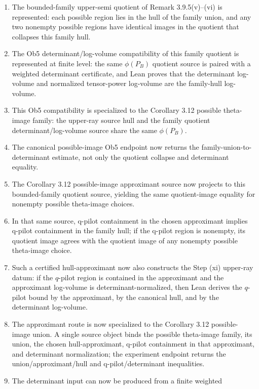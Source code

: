 \documentclass[11pt]{article}
\newcommand{\Lean}{Lean}
\theoremstyle{plain}
\theoremstyle{definition}
\theoremstyle{remark}
\begin{document}
\begin{enumerate}
  an approximant lies inside the canonical hull \(\phi(P)\), has log-volume
  between \(P\) and \(\phi(P)\), and is fixed by hull formation.
\item The bounded-family upper-semi quotient of Remark 3.9.5(v)--(vi) is
  represented: each possible region lies in the hull of the family union, and
  any two nonempty possible regions have identical images in the quotient that
  collapses this family hull.
\item The Ob5 determinant/log-volume compatibility of this family quotient is
  represented at finite level: the same \(\phi(P_B)\) quotient source is paired
  with a weighted determinant certificate, and \Lean{} proves that the
  determinant log-volume and normalized tensor-power log-volume are the
  family-hull log-volume.
\item This Ob5 compatibility is specialized to the Corollary 3.12 possible
  theta-image family: the upper-ray source hull and the family quotient
  determinant/log-volume source share the same \(\phi(P_B)\).
\item The canonical possible-image Ob5 endpoint now returns the
  family-union-to-determinant estimate, not only the quotient collapse and
  determinant equality.
\item The Corollary 3.12 possible-image approximant source now projects to
  this bounded-family quotient source, yielding the same quotient-image
  equality for nonempty possible theta-image choices.
\item In that same source, q-pilot containment in the chosen approximant
  implies q-pilot containment in the family hull; if the q-pilot region is
  nonempty, its quotient image agrees with the quotient image of any nonempty
  possible theta-image choice.
\item Such a certified hull-approximant now also constructs the Step (xi)
  upper-ray datum: if the \(q\)-pilot region is contained in the approximant
  and the approximant log-volume is determinant-normalized, then \Lean{}
  derives the \(q\)-pilot bound by the approximant, by the canonical hull, and
  by the determinant log-volume.
\item The approximant route is now specialized to the Corollary 3.12
  possible-image union.  A single source object binds the possible theta-image
  family, its union, the chosen hull-approximant, q-pilot containment in that
  approximant, and determinant normalization; the experiment endpoint returns
  the union/approximant/hull and q-pilot/determinant inequalities.
\item The determinant input can now be produced from a finite weighted

\end{enumerate}
\end{document}
